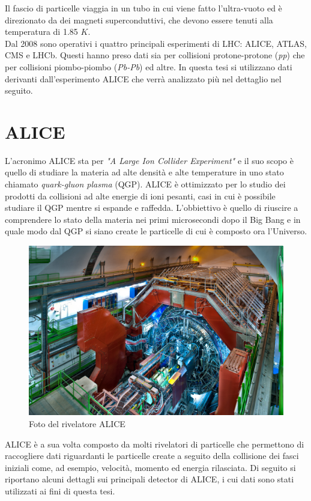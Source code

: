 Il fascio di particelle viaggia in un tubo in cui viene fatto l'ultra-vuoto ed è direzionato da dei magneti superconduttivi, che devono essere tenuti alla temperatura di 1.85 $K$.
\\Dal 2008 sono operativi i quattro principali esperimenti di LHC: ALICE, ATLAS, CMS e LHCb. Questi hanno preso dati sia per collisioni protone-protone (\textit{pp}) che per collisioni piombo-piombo (\textit{Pb-Pb}) ed altre. In questa tesi si utilizzano dati derivanti dall'esperimento ALICE che verrà  analizzato più nel dettaglio nel seguito. \cite{sito_cern_LHC} 



\section{ALICE}

L'acronimo ALICE sta per \textit{"A Large Ion Collider Experiment"} e il suo scopo è quello di studiare la materia ad alte densità e alte temperature in uno stato chiamato \textit{quark-gluon plasma} (QGP). ALICE è ottimizzato per lo studio dei prodotti da collisioni ad alte energie di ioni pesanti, casi in cui è possibile studiare il QGP mentre si espande e raffedda. L'obbiettivo è quello di riuscire a comprendere lo stato della materia nei primi microsecondi dopo il Big Bang e in quale modo dal QGP si siano create le particelle di cui è composto ora l'Universo. \cite{sito_cern_ALICE} 
    
    \begin{figure}[htbp]
        \centering
        \includegraphics[width=0.6\linewidth]{ALICE/ALICE_LRsaba_CERN_0212_3219.jpg}
        \caption{Foto del rivelatore ALICE}
        \label{fig:ALICEcomplex}
    \end{figure}
    
ALICE è a sua volta composto da molti rivelatori di particelle che permettono di raccogliere dati riguardanti le particelle create a seguito della collisione dei fasci iniziali come, ad esempio, velocità, momento ed energia rilasciata. Di seguito si riportano alcuni dettagli sui principali detector di ALICE, i cui dati sono stati utilizzati ai fini di questa tesi.

